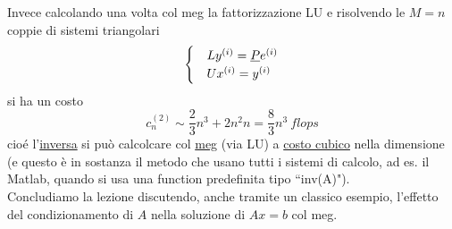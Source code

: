 Invece calcolando una volta col meg la fattorizzazione LU e risolvendo le $M=n$ coppie di sistemi triangolari
\begin{equation*}
    \begin{cases}
        & Ly^{(i)} = \uline{P}e^{(i)} \\
        & Ux^{(i)} = y^{(i)}
    \end{cases}
\end{equation*}
si ha un costo 
\begin{equation*}
    c_n^{(2)} \sim \frac{2}{3}n^3 + 2n^2n = \frac{8}{3}n^3 \ flops
\end{equation*}
cioé l'\uline{inversa} si può calcolcare col \uline{meg} (via LU) a \uline{costo cubico} nella dimensione (e questo è in sostanza il metodo che usano tutti i sistemi di calcolo, ad es. il Matlab, quando si usa una function predefinita tipo ``inv(A)").\\
Concludiamo la lezione discutendo, anche tramite un classico esempio, l'effetto del condizionamento di $A$ nella soluzione di $Ax=b$ col meg.

